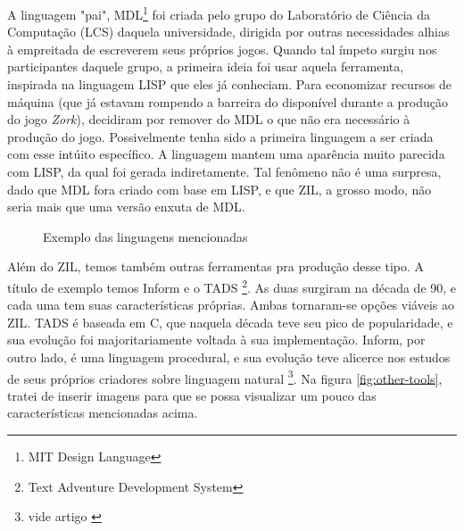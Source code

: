 A linguagem "pai", MDL\footnote{MIT Design Language} foi criada pelo grupo do
Laboratório de Ciência da Computação (LCS) daquela universidade, dirigida por
outras necessidades alhias à empreitada de escreverem seus próprios jogos. Quando
tal ímpeto surgiu nos participantes daquele grupo, a primeira ideia foi usar
aquela ferramenta, inspirada na linguagem LISP que eles já conheciam. Para
economizar recursos de máquina (que já estavam rompendo a barreira do disponível
durante a produção do jogo \emph{Zork}), decidiram por remover do MDL o que não
era necessário à produção do jogo. Possivelmente tenha sido a primeira linguagem
a ser criada com esse intúito específico. A linguagem mantem uma aparência muito
parecida com LISP, da qual foi gerada indiretamente. Tal fenômeno não é uma
surpresa, dado que MDL fora criado com base em LISP, e que ZIL, a grosso modo,
não seria mais que uma versão enxuta de MDL.

\begin{figure}
  \centering
  \caption{Exemplo das linguagens mencionadas}
  \label{fig:zil}
\end{figure}

Além do ZIL, temos também outras ferramentas pra produção desse tipo. A título
de exemplo temos Inform e o TADS \footnote{Text Adventure Development System}.
As duas surgiram na década de 90, e cada uma tem suas características próprias.
Ambas tornaram-se opções viáveis ao ZIL. TADS é baseada em C, que naquela década
teve seu pico de popularidade, e sua evolução foi majoritariamente voltada à sua
implementação. Inform, por outro lado, é uma linguagem procedural, e sua
evolução teve alicerce nos estudos de seus próprios criadores sobre linguagem
natural \footnote{vide artigo \citet{Nel:06}}. Na figura \ref{fig:other-tools},
tratei de inserir imagens para que se possa visualizar um pouco das
características mencionadas acima.

